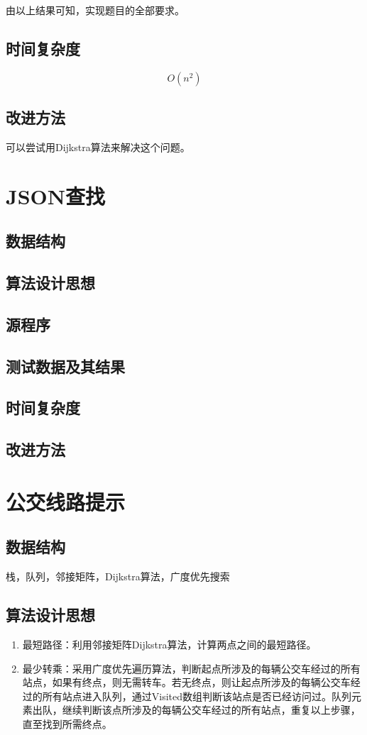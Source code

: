 \documentclass[a4paper,11pt,UTF8]{ctexart}
\begin{document}
    由以上结果可知，实现题目的全部要求。

\subsection{时间复杂度}
$$
O(n^2)
$$
\subsection{改进方法}
可以尝试用Dijkstra算法来解决这个问题。
\section{JSON查找}

\subsection{数据结构}
\subsection{算法设计思想}
\subsection{源程序}
\subsection{测试数据及其结果}
\subsection{时间复杂度}
\subsection{改进方法}

\section{公交线路提示}
\subsection{数据结构}
栈，队列，邻接矩阵，Dijkstra算法，广度优先搜索
\subsection{算法设计思想}

\begin{enumerate}
   \item 最短路径：利用邻接矩阵Dijkstra算法，计算两点之间的最短路径。
   \item 最少转乘：采用广度优先遍历算法，判断起点所涉及的每辆公交车经过的所有站点，如果有终点，则无需转车。若无终点，则让起点所涉及的每辆公交车经过的所有站点进入队列，通过Visited数组判断该站点是否已经访问过。队列元素出队，继续判断该点所涉及的每辆公交车经过的所有站点，重复以上步骤，直至找到所需终点。
\end{enumerate}\par
\end{document}
